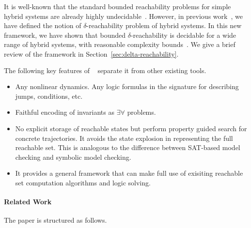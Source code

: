 It is well-known that the standard bounded reachability problems for
simple hybrid systems are already highly
undecidable~\cite{DBLP:conf/rex/AlurD91,DBLP:conf/hybrid/AlurCHH92}. However, in
previous work~\cite{}, we have defined the notion of
$\delta$-reachability problem of hybrid systems. In this new
framework, we have shown that bounded $\delta$-reachability is
decidable for a wide range of hybrid systems, with reasonable
complexity bounds~\cite{}. We give a brief review of the framework in
Section~\ref{sec:delta-reachability}.

The following key features of ~\dReach{} separate it from other existing tools.
\begin{itemize}
\item Any nonlinear dynamics. Any logic formulas in the signature for describing jumps, conditions, etc.
\item Faithful encoding of invariants as $\exists\forall$ problems.
\item No explicit storage of reachable states but perform property guided search for concrete trajectories.
It avoids the state explosion in representing the full reachable set. This is analogous to the difference between SAT-based
model checking and symbolic model checking.
\item It provides a general framework that can make full use of exisiting reachable set computation algorithms and logic solving.
\end{itemize}

\paragraph{Related Work}



The paper is structured as follows.

\newpage
